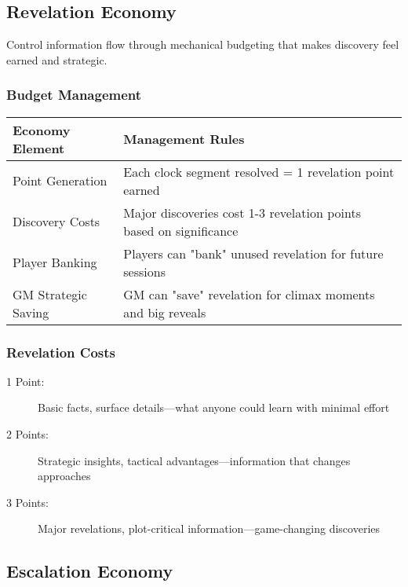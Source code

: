 \subsection*{Revelation Economy}

Control information flow through mechanical budgeting that makes discovery feel earned and strategic.

\subsubsection*{Budget Management}

\begin{fatebox}
\begin{tabularx}{\textwidth}{lX}
\toprule
\textbf{Economy Element} & \textbf{Management Rules} \\
\midrule
Point Generation & Each clock segment resolved = 1 revelation point earned \\
Discovery Costs & Major discoveries cost 1-3 revelation points based on significance \\
Player Banking & Players can "bank" unused revelation for future sessions \\
GM Strategic Saving & GM can "save" revelation for climax moments and big reveals \\
\bottomrule
\end{tabularx}
\end{fatebox}

\subsubsection*{Revelation Costs}

\begin{description}
    \item[1 Point:] Basic facts, surface details—what anyone could learn with minimal effort
    \item[2 Points:] Strategic insights, tactical advantages—information that changes approaches
    \item[3 Points:] Major revelations, plot-critical information—game-changing discoveries
\end{description}

\subsection*{Escalation Economy}

